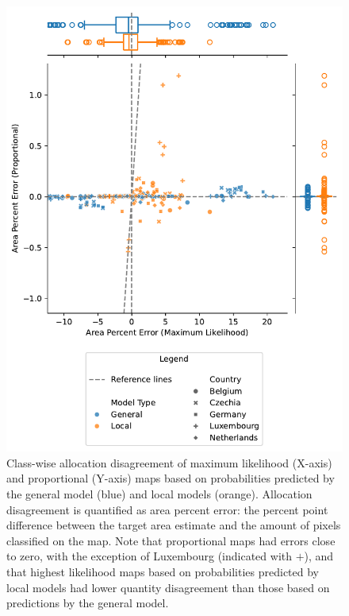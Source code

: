     \begin{figure}[H]
        \centering
        \includegraphics[width=\linewidth]{figs_04/fig11_jointplot_area_percent_error.pdf}
        \caption{Class-wise allocation disagreement of maximum likelihood (X-axis) and proportional (Y-axis) maps based on probabilities predicted by the general model (blue) and local models (orange). Allocation disagreement is quantified as area percent error: the percent point difference between the target area estimate and the amount of pixels classified on the map. Note that proportional maps had errors close to zero, with the exception of Luxembourg (indicated with $+$), and that highest likelihood maps based on probabilities predicted by local models had lower quantity disagreement than those based on predictions by the general model.}
        \label{fig:quantity_disagreement}
    \end{figure}
    
